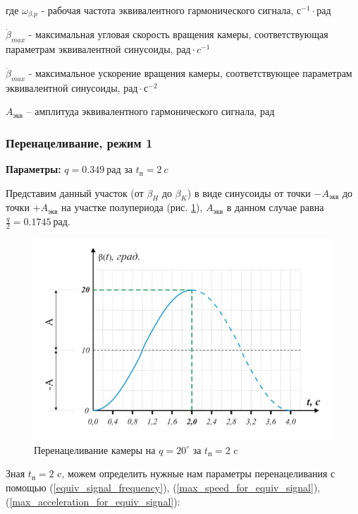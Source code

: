 где $\omega_{\beta.p}$ - рабочая частота эквивалентного гармонического сигнала, $\textit{с}^{-1} \cdot
\textit{рад}$

$\dot{\beta}_{max}$ - максимальная угловая скорость вращения камеры,
соответствующая параметрам эквивалентной синусоиды, $\textit{рад} \cdot \textit{c}^{-1}$

$\ddot{\beta}_{max}$ - максимальное ускорение вращения камеры,
соответствующее параметрам эквивалентной синусоиды, $\textit{рад} \cdot \textit{с}^{-2}$

$A_{\textit{экв}}$ – амплитуда эквивалентного гармонического сигнала, $\textit{рад}$

\subsubsection{Перенацеливание, режим 1}

\textbf{Параметры:} $q = 0.349 ~\textit{рад}$ за $t_{\textit{п}} = 2 ~\textit{c}$

Представим данный участок (от $\beta_{H}$ до $\beta_{K}$) в виде синусоиды
от точки $-A_\textit{экв}$ до точки $+A_\textit{экв}$ на участке полупериода
(рис. \ref{retarget_20grad_2sec}), $A_\textit{экв}$ в данном случае
равна $\frac{q}{2} = 0.1745 ~\textit{рад}$.

\begin{figure}[ht!]
    \centering
    \includegraphics[keepaspectratio]{./src/pictures/retarget_equivalent_input_signals/20grad_2sec}
    \caption{Перенацеливание камеры на $q = 20^{\circ}$ за $t_\textit{п} = 2$ c}
    \label{retarget_20grad_2sec}
\end{figure}

Зная $t_{\textit{п} } = 2$ c, можем определить нужные нам параметры перенацеливания
с помощью (\ref{equiv_signal_frequency}),
(\ref{max_speed_for_equiv_signal}),
(\ref{max_acceleration_for_equiv_signal}):

